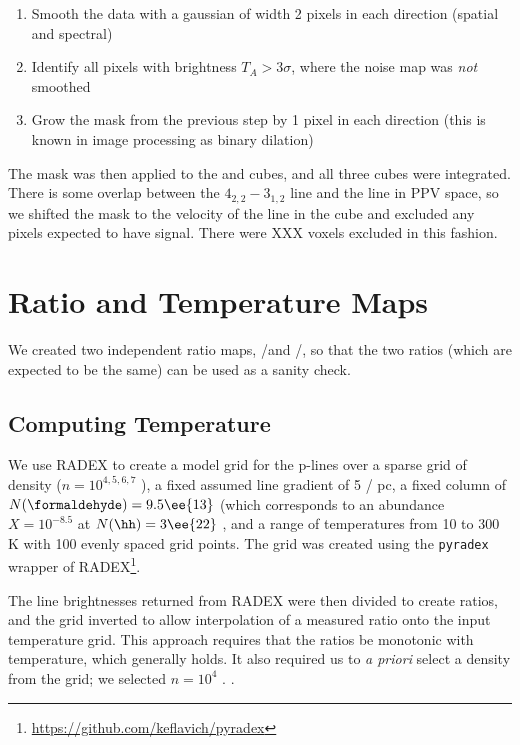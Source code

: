 \begin{enumerate}
    \item Smooth the data with a gaussian of width 2 pixels in each direction
        (spatial and spectral)
    \item Identify all pixels with brightness $T_A > 3\sigma$, where the noise
        map was \emph{not} smoothed
    \item Grow the mask from the previous step by 1 pixel in each direction
        (this is known in image processing as binary dilation)
\end{enumerate}

The \formaldehyde \threeohthree mask was then applied to the \threetwoone and
\threetwotwo cubes, and all three cubes were integrated.  There is some overlap
between the \methanol $4_{2,2}-3_{1,2}$ line and the \formaldehyde \threetwotwo
line in PPV space, so we shifted the \formaldehyde mask to the velocity of the
\methanol line in the \formaldehyde \threetwotwo cube and excluded any pixels
expected to have signal.  There were XXX voxels excluded in this fashion.


\section{Ratio and Temperature Maps}
\label{sec:h2co}
We created two independent ratio maps, \threeohthree/\threetwotwo and
\threeohthree/\threetwoone, so that the two ratios (which are expected to be
the same) can be used as a sanity check.

\subsection{Computing Temperature}
We use RADEX \citet{van-Der-Tak2007a} to create a model grid for the
p-\formaldehyde lines over a sparse grid of density ($n=10^{4,5,6,7}$ \percc),
a fixed assumed line gradient of 5 \kms / pc, a fixed column of \formaldehyde
$N(\formaldehyde) = 9.5\ee{13}$ \persc (which corresponds to an abundance
$X=10^{-8.5}$ at $N(\hh) = 3\ee{22}$ \persc, and a range of temperatures from
10 to 300 K with 100 evenly spaced grid points.  The grid was created using
the \texttt{pyradex} wrapper of
RADEX\footnote{\url{https://github.com/keflavich/pyradex}}.

The line brightnesses returned from RADEX were then divided to create ratios,
and the grid inverted to allow interpolation of a measured ratio onto the input
temperature grid.   This approach requires that the ratios be monotonic with
temperature, which generally holds.  It also required us to \emph{a priori} select
a density from the grid; we selected $n=10^4$ \percc.  .



